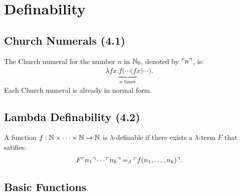 \section{Definability}

\subsection{Church Numerals (4.1)}

The Church numeral for the number $n$ in $\mathbb{N}_0$, denoted by 
$\ulcorner n \urcorner$, is: \begin{align*}
    \lambda fx. \underbrace{f(\cdots (f}_{n \text{ times}}  x) \cdots).
\end{align*} Each Church numeral is already in normal form.

\subsection{Lambda Definability (4.2)}

A function $f : \mathbb{N} \times \cdots \times \mathbb{N} \to \mathbb{N}$
is $\lambda$-definable if there exists a $\lambda$-term $F$ that
satifies: \begin{align*}
    F \ulcorner n_1 \urcorner \cdots \ulcorner n_k \urcorner =_\beta \ulcorner f(n_1, \ldots, n_k) \urcorner.
\end{align*}

\subsection{Basic Functions}

